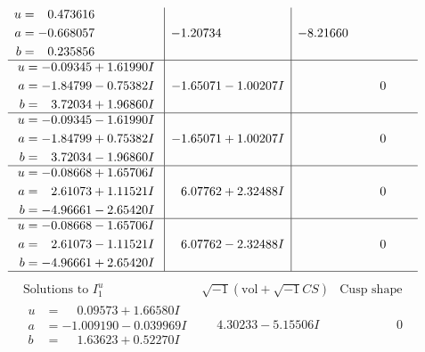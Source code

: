 \documentclass[1p]{elsarticle_modified}
\theoremstyle{definition}
\newcommand{\I}{\sqrt{-1}}
\begin{document}
$$\begin{array}{c|c|c}
\begin{aligned}
u &= \phantom{-}0.473616\phantom{ +0.000000I} \\
a &= -0.668057\phantom{ +0.000000I} \\
b &= \phantom{-}0.235856\phantom{ +0.000000I}\end{aligned}
 & -1.20734\phantom{ +0.000000I} & -8.21660\phantom{ +0.000000I} \\ \hline\begin{aligned}
u &= -0.09345 + 1.61990 I \\
a &= -1.84799 - 0.75382 I \\
b &= \phantom{-}3.72034 + 1.96860 I\end{aligned}
 & -1.65071 - 1.00207 I & \phantom{-0.000000 } 0 \\ \hline\begin{aligned}
u &= -0.09345 - 1.61990 I \\
a &= -1.84799 + 0.75382 I \\
b &= \phantom{-}3.72034 - 1.96860 I\end{aligned}
 & -1.65071 + 1.00207 I & \phantom{-0.000000 } 0 \\ \hline\begin{aligned}
u &= -0.08668 + 1.65706 I \\
a &= \phantom{-}2.61073 + 1.11521 I \\
b &= -4.96661 - 2.65420 I\end{aligned}
 & \phantom{-}6.07762 + 2.32488 I & \phantom{-0.000000 } 0 \\ \hline\begin{aligned}
u &= -0.08668 - 1.65706 I \\
a &= \phantom{-}2.61073 - 1.11521 I \\
b &= -4.96661 + 2.65420 I\end{aligned}
 & \phantom{-}6.07762 - 2.32488 I & \phantom{-0.000000 } 0\\
 \hline 
 \end{array}$$\newpage$$\begin{array}{c|c|c}  
\text{Solutions to }I^u_{1}& \I (\text{vol} + \sqrt{-1}CS) & \text{Cusp shape}\\
 \hline 
\begin{aligned}
u &= \phantom{-}0.09573 + 1.66580 I \\
a &= -1.009190 - 0.039969 I \\
b &= \phantom{-}1.63623 + 0.52270 I\end{aligned}
 & \phantom{-}4.30233 - 5.15506 I & \phantom{-0.000000 } 0 \\ \hline\begin{aligned}

\end{aligned}
\end{array}$$
\end{document}
